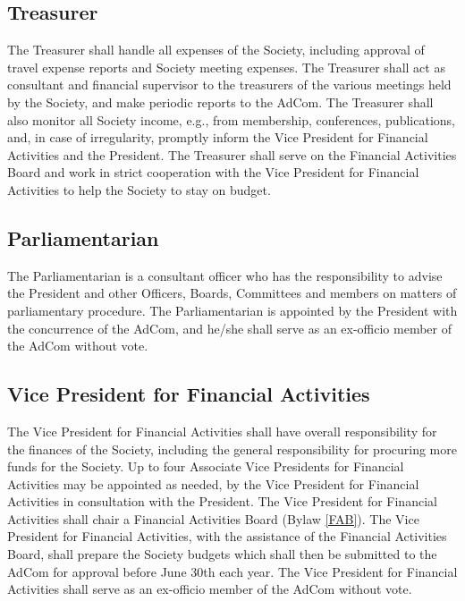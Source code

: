 \documentclass[10pt]{article}
\newcommand{\blref}[1]{Bylaw \ref{#1}}
\begin{document}
\subsection{Treasurer}

The Treasurer shall handle all expenses of the Society, including approval of travel expense reports and Society meeting expenses. The Treasurer shall act as consultant and financial supervisor to the treasurers of the various meetings held by the Society, and make periodic reports to the AdCom. The Treasurer shall also monitor all Society income, e.g., from membership, conferences, publications, and, in case of irregularity, promptly inform the Vice President for Financial Activities and the President. The Treasurer shall serve on the Financial Activities Board and work in strict cooperation with the Vice President for Financial Activities to help the Society to stay on budget.  


\subsection{Parliamentarian}

The Parliamentarian is a consultant officer who has the responsibility to advise the President and other Officers, Boards, Committees and members on matters of parliamentary procedure. The Parliamentarian is appointed by the President with the concurrence of the AdCom, and he/she shall serve as an ex-officio member of the AdCom without vote.


\subsection{Vice President for Financial Activities}

The Vice President for Financial Activities shall have overall responsibility for the finances of the Society, including the general responsibility for procuring more funds for the Society. Up to four Associate Vice Presidents for Financial Activities may be appointed as needed, by the Vice President for Financial Activities in consultation with the President. The Vice President for Financial Activities shall chair a Financial Activities Board (\blref{FAB}). The Vice President for Financial Activities, with the assistance of the Financial Activities Board, shall prepare the Society budgets which shall then be submitted to the AdCom for approval before June 30th each year. The Vice President for Financial Activities shall serve as an ex-officio member of the AdCom without vote.
\end{document}
